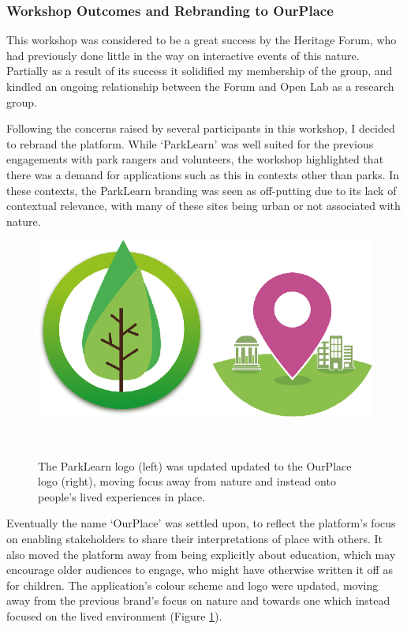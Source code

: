 \subsubsection{Workshop Outcomes and Rebranding to OurPlace}
This workshop was considered to be a great success by the Heritage Forum, who had previously done little in the way on interactive events of this nature. Partially as a result of its success it solidified my membership of the group, and kindled an ongoing relationship between the Forum and Open Lab as a research group.

Following the concerns raised by several participants in this workshop, I decided to rebrand the platform. While `ParkLearn' was well suited for the previous engagements with park rangers and volunteers, the workshop highlighted that there was a demand for applications such as this in contexts other than parks. In these contexts, the ParkLearn branding was seen as off-putting due to its lack of contextual relevance, with many of these sites being urban or not associated with nature. 

\begin{figure}
  \centering
  \includegraphics[width=0.8\columnwidth]{images/chapter06/logos.png}
  \caption[The ParkLearn and OurPlace Logos]{The ParkLearn logo (left) was updated updated to the OurPlace logo (right), moving focus away from nature and instead onto people's lived experiences in place.}~\label{fig:AppLogos}
\end{figure}

Eventually the name `OurPlace' was settled upon, to reflect the platform's focus on enabling stakeholders to share their interpretations of place with others. It also moved the platform away from being explicitly about education, which may encourage older audiences to engage, who might have otherwise written it off as for children. The application's colour scheme and logo were updated, moving away from the previous brand's focus on nature and towards one which instead focused on the lived environment (Figure \ref{fig:AppLogos}).

